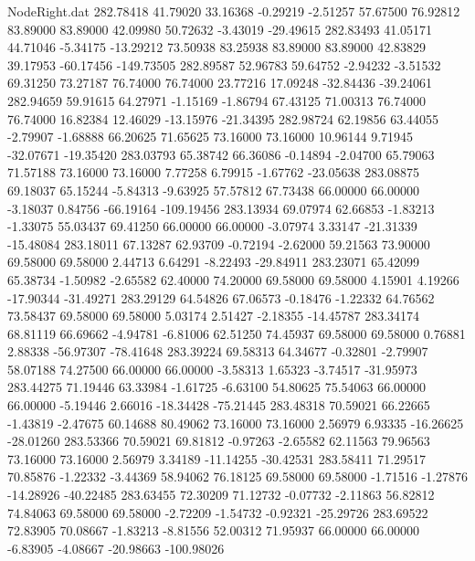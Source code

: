 \begin{filecontents}{NodeRight.dat}
 282.78418   41.79020   33.16368    -0.29219   -2.51257   57.67500   76.92812   83.89000   83.89000   42.09980   50.72632   -3.43019  -29.49615
 282.83493   41.05171   44.71046    -5.34175  -13.29212   73.50938   83.25938   83.89000   83.89000   42.83829   39.17953  -60.17456 -149.73505
 282.89587   52.96783   59.64752    -2.94232   -3.51532   69.31250   73.27187   76.74000   76.74000   23.77216   17.09248  -32.84436  -39.24061
 282.94659   59.91615   64.27971    -1.15169   -1.86794   67.43125   71.00313   76.74000   76.74000   16.82384   12.46029  -13.15976  -21.34395
 282.98724   62.19856   63.44055    -2.79907   -1.68888   66.20625   71.65625   73.16000   73.16000   10.96144    9.71945  -32.07671  -19.35420
 283.03793   65.38742   66.36086    -0.14894   -2.04700   65.79063   71.57188   73.16000   73.16000    7.77258    6.79915   -1.67762  -23.05638
 283.08875   69.18037   65.15244    -5.84313   -9.63925   57.57812   67.73438   66.00000   66.00000   -3.18037    0.84756  -66.19164 -109.19456
 283.13934   69.07974   62.66853    -1.83213   -1.33075   55.03437   69.41250   66.00000   66.00000   -3.07974    3.33147  -21.31339  -15.48084
 283.18011   67.13287   62.93709    -0.72194   -2.62000   59.21563   73.90000   69.58000   69.58000    2.44713    6.64291   -8.22493  -29.84911
 283.23071   65.42099   65.38734    -1.50982   -2.65582   62.40000   74.20000   69.58000   69.58000    4.15901    4.19266  -17.90344  -31.49271
 283.29129   64.54826   67.06573    -0.18476   -1.22332   64.76562   73.58437   69.58000   69.58000    5.03174    2.51427   -2.18355  -14.45787
 283.34174   68.81119   66.69662    -4.94781   -6.81006   62.51250   74.45937   69.58000   69.58000    0.76881    2.88338  -56.97307  -78.41648
 283.39224   69.58313   64.34677    -0.32801   -2.79907   58.07188   74.27500   66.00000   66.00000   -3.58313    1.65323   -3.74517  -31.95973
 283.44275   71.19446   63.33984    -1.61725   -6.63100   54.80625   75.54063   66.00000   66.00000   -5.19446    2.66016  -18.34428  -75.21445
 283.48318   70.59021   66.22665    -1.43819   -2.47675   60.14688   80.49062   73.16000   73.16000    2.56979    6.93335  -16.26625  -28.01260
 283.53366   70.59021   69.81812    -0.97263   -2.65582   62.11563   79.96563   73.16000   73.16000    2.56979    3.34189  -11.14255  -30.42531
 283.58411   71.29517   70.85876    -1.22332   -3.44369   58.94062   76.18125   69.58000   69.58000   -1.71516   -1.27876  -14.28926  -40.22485
 283.63455   72.30209   71.12732    -0.07732   -2.11863   56.82812   74.84063   69.58000   69.58000   -2.72209   -1.54732   -0.92321  -25.29726
 283.69522   72.83905   70.08667    -1.83213   -8.81556   52.00312   71.95937   66.00000   66.00000   -6.83905   -4.08667  -20.98663 -100.98026

\end{filecontents}
